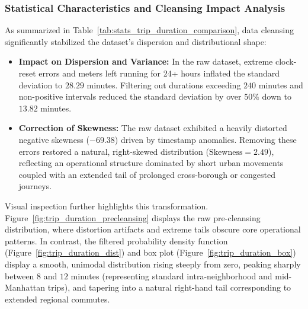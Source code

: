 \documentclass[11pt,a4paper]{article}
\begin{document}
\subsubsection{Statistical Characteristics and Cleansing Impact Analysis}
As summarized in Table~\ref{tab:stats_trip_duration_comparison}, data cleansing significantly stabilized the dataset's dispersion and distributional shape:
\begin{itemize}
    \item \textbf{Impact on Dispersion and Variance:} In the raw dataset, extreme clock-reset errors and meters left running for 24+ hours inflated the standard deviation to $28.29$ minutes. Filtering out durations exceeding $240$ minutes and non-positive intervals reduced the standard deviation by over $50\%$ down to $13.82$ minutes.
    \item \textbf{Correction of Skewness:} The raw dataset exhibited a heavily distorted negative skewness ($-69.38$) driven by timestamp anomalies. Removing these errors restored a natural, right-skewed distribution ($\text{Skewness} = 2.49$), reflecting an operational structure dominated by short urban movements coupled with an extended tail of prolonged cross-borough or congested journeys.
\end{itemize}

Visual inspection further highlights this transformation. Figure~\ref{fig:trip_duration_precleansing} displays the raw pre-cleansing distribution, where distortion artifacts and extreme tails obscure core operational patterns. In contrast, the filtered probability density function (Figure~\ref{fig:trip_duration_dist}) and box plot (Figure~\ref{fig:trip_duration_box}) display a smooth, unimodal distribution rising steeply from zero, peaking sharply between $8$ and $12$ minutes (representing standard intra-neighborhood and mid-Manhattan trips), and tapering into a natural right-hand tail corresponding to extended regional commutes.
\end{document}

